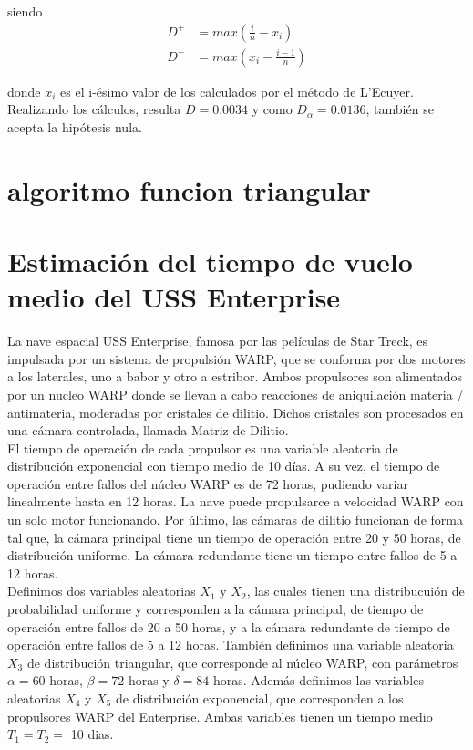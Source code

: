 \documentclass[10pt,journal,compsoc]{IEEEtran}
\begin{document}
siendo
\begin{align}
 D^{+} &= max(\frac{i}{n}-x_i)\\
 D^{-} &= max(x_i - \frac{i-1}{n})
\end{align}

donde $x_i$ es el i-\'esimo valor de los calculados por el m\'etodo de L'Ecuyer.
Realizando los c\'alculos, resulta $D = 0.0034$ y como $D_{\alpha} = 0.0136$,
tambi\'en se acepta la hip\'otesis nula.

\section{}

\section{algoritmo funcion triangular}

\section{Estimaci\'on del tiempo de vuelo medio del USS Enterprise}
La nave espacial USS Enterprise, famosa por las pel\'iculas de Star Treck, es impulsada por un sistema de propulsi\'on WARP, 
que se conforma por dos motores a los laterales, uno a babor y otro a estribor. Ambos propulsores son alimentados por un nucleo WARP
donde se llevan a cabo reacciones de aniquilaci\'on materia / antimateria, moderadas por cristales de dilitio. Dichos cristales 
son procesados en una c\'amara controlada, llamada Matriz de Dilitio.\\
El tiempo de operaci\'on de cada propulsor es una variable aleatoria de distribuci\'on exponencial con tiempo medio de 10 d\'ias. 
A su vez, el tiempo de operaci\'on entre fallos del n\'ucleo WARP es de 72 horas, pudiendo variar linealmente hasta en 12 horas. 
La nave puede propulsarce a velocidad WARP con un solo motor funcionando. Por \'ultimo, las c\'amaras de dilitio funcionan de forma tal que, la c\'amara principal tiene un tiempo de operaci\'on entre 
20 y 50 horas, de distribuci\'on uniforme. La c\'amara redundante tiene un tiempo entre fallos de 5 a 12 horas.\\
\indent Definimos dos variables aleatorias  $X_1$ y $X_2$, las cuales tienen una distribucui\'on de probabilidad uniforme y corresponden 
a la c\'amara principal, de tiempo de operaci\'on entre fallos de 20 a 50 horas, y a la c\'amara redundante de tiempo de 
operaci\'on entre fallos de 5 a 12 horas. Tambi\'en definimos una variable aleatoria $X_3$ de distribuci\'on 
triangular, que corresponde al n\'ucleo WARP, con par\'ametros $\alpha = 60$ horas, $\beta = 72$ horas y $\delta = 84$ horas. Adem\'as
definimos las variables aleatorias $X_4$ y $X_5$ de distribuci\'on exponencial, que corresponden a los propulsores WARP del Enterprise.
Ambas variables tienen un tiempo medio $T_1 = T_2 = $ 10 dias.\\
\end{document}

